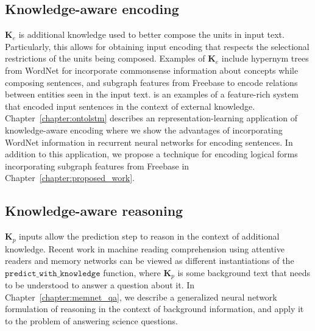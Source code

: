 \subsection{Knowledge-aware encoding}
$\mathbf{K}_e$ is additional knowledge used to better compose the units in input text. Particularly, this allows for
obtaining input encoding that respects the selectional restrictions of the units being composed.
Examples of $\mathbf{K}_e$ include hypernym trees from WordNet for
incorporate commonsense information about concepts while composing sentences, and subgraph features from Freebase to encode relations
between entities seen in the input text. \cite{moldovan2001logic} is an examples of a feature-rich system that encoded input sentences in the 
context of external knowledge. Chapter~\ref{chapter:ontolstm} describes an representation-learning application of knowledge-aware encoding where 
we show the advantages of incorporating WordNet information in recurrent neural networks for encoding sentences. In addition to this application,
we propose a technique for encoding logical forms incorporating subgraph features from Freebase in Chapter~\ref{chapter:proposed_work}.

\subsection{Knowledge-aware reasoning}
$\textbf{K}_p$ inputs allow the prediction step to reason in the context of additional knowledge. Recent work in machine reading comprehension using 
attentive readers \cite{hermann2015teaching} and memory networks \cite{weston2014memory,Sukhbaatar2015EndToEndMN,Xiong2016DynamicMN} can be viewed as different instantiations
of the $\mathtt{predict\_with\_knowledge}$ function, where $\textbf{K}_p$ is some background text that needs to be understood to answer a question about it. 
In Chapter~\ref{chapter:memnet_qa}, we describe a generalized neural network formulation of reasoning in the context of background information,
and apply it to the problem of answering science questions.


